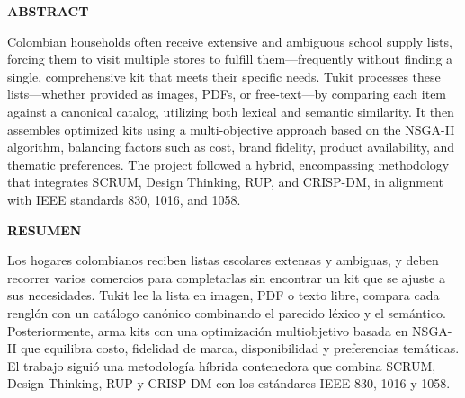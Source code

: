 \begin{center}
    \textbf{ABSTRACT}
\end{center}

\vspace{0.25cm}

Colombian households often receive extensive and ambiguous school supply lists, forcing them to visit multiple stores to fulfill them—frequently without finding a single, comprehensive kit that meets their specific needs. Tukit processes these lists—whether provided as images, PDFs, or free-text—by comparing each item against a canonical catalog, utilizing both lexical and semantic similarity. It then assembles optimized kits using a multi-objective approach based on the NSGA-II algorithm, balancing factors such as cost, brand fidelity, product availability, and thematic preferences. The project followed a hybrid, encompassing methodology that integrates SCRUM, Design Thinking, RUP, and CRISP-DM, in alignment with IEEE standards 830, 1016, and 1058.
\begin{center}
    {\textbf{RESUMEN}}
\end{center}

\vspace{0.25cm}

Los hogares colombianos reciben listas escolares extensas y ambiguas, y deben recorrer
varios comercios para completarlas sin encontrar un kit que se ajuste a sus necesidades.
Tukit lee la lista en imagen, PDF o texto libre, compara cada renglón con un catálogo
canónico combinando el parecido léxico y el semántico. Posteriormente, arma kits con una optimización
multiobjetivo basada en NSGA-II que equilibra costo, fidelidad de marca, disponibilidad y
preferencias temáticas. El trabajo siguió una metodología híbrida contenedora que combina
SCRUM, Design Thinking, RUP y CRISP-DM con los estándares IEEE 830, 1016 y 1058.